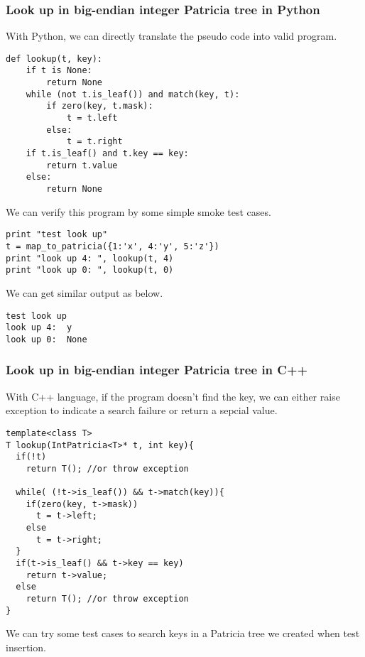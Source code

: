 \documentclass{article}
\begin{document}
\subsubsection*{Look up in big-endian integer Patricia tree in Python}
With Python, we can directly translate the pseudo code into valid
program.

\lstset{language=Python}
\begin{lstlisting}
def lookup(t, key):
    if t is None:
        return None
    while (not t.is_leaf()) and match(key, t):
        if zero(key, t.mask):
            t = t.left
        else:
            t = t.right
    if t.is_leaf() and t.key == key:
        return t.value
    else:
        return None
\end{lstlisting}

We can verify this program by some simple smoke test cases.

\begin{lstlisting}
print "test look up"
t = map_to_patricia({1:'x', 4:'y', 5:'z'})
print "look up 4: ", lookup(t, 4)
print "look up 0: ", lookup(t, 0)
\end{lstlisting}

We can get similar output as below.

\begin{verbatim}
test look up
look up 4:  y
look up 0:  None
\end{verbatim}

\subsubsection*{Look up in big-endian integer Patricia tree in C++}

With C++ language, if the program doesn't find the key, we can either
raise exception to indicate a search failure or return a sepcial
value.

\lstset{language=C++}
\begin{lstlisting}
template<class T>
T lookup(IntPatricia<T>* t, int key){
  if(!t)
    return T(); //or throw exception

  while( (!t->is_leaf()) && t->match(key)){
    if(zero(key, t->mask))
      t = t->left;
    else
      t = t->right;
  }
  if(t->is_leaf() && t->key == key)
    return t->value;
  else
    return T(); //or throw exception
}
\end{lstlisting}

We can try some test cases to search keys in a Patricia tree we
created when test insertion.
\end{document}
